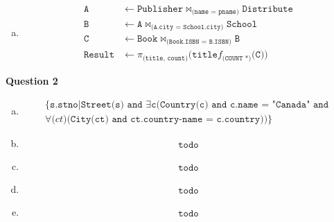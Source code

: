 \documentclass[11pt]{article}
\def\code#1{\texttt{#1}}
\def\join#1#2#3{\code{#1} \bowtie_{\code{(#2)}} \code{#3}}
\def\fun#1#2{f_{\code{(#1)}}{\code{(#2)}}}
\def\fun#1#2#3{\code{#1}f_{\code{(#2)}}{\code{(#3)}}}
\def\expr#1#2{\{\code{#1} | #2\}}
\begin{document}
\begin{enumerate}[a.]
    \item
      \begin{equation*}
      \begin{aligned}
        \code{A} &\leftarrow \join{Publisher}{name = pname}{Distribute} \\
        \code{B} &\leftarrow \join{A}{A.city = School.city}{School} \\
        \code{C} &\leftarrow \join{Book}{Book.ISBN = B.ISBN}{B} \\
        \code{Result} &\leftarrow \pi_{\code{(title, count)}} \code{(}\fun{title}{COUNT *}{C}\code{)}
      \end{aligned}
      \end{equation*}
  \end{enumerate}


\item[] \textbf{Question 2}

  \begin{enumerate}[a.]

    \item
      \begin{equation*}
      \begin{aligned}
        \expr{s.stno} {\code{Street(s) and } \exists{\code{c}} \code{(Country(c) and c.name = "Canada" and } \\
          \forall{\code(ct)} \code{(City(ct) and ct.country-name = c.country))}
      }
      \end{aligned}
      \end{equation*}

    \item 
      \begin{equation*}
      \begin{aligned}
				\code{todo}
      \end{aligned}
      \end{equation*}

    \item
      \begin{equation*}
      \begin{aligned}
				\code{todo}
      \end{aligned}
      \end{equation*}

    \item
      \begin{equation*}
      \begin{aligned}
				\code{todo}
      \end{aligned}
      \end{equation*}

    \item
      \begin{equation*}
      \begin{aligned}
				\code{todo}
      \end{aligned}
      \end{equation*}

  \end{enumerate}
\end{document}
